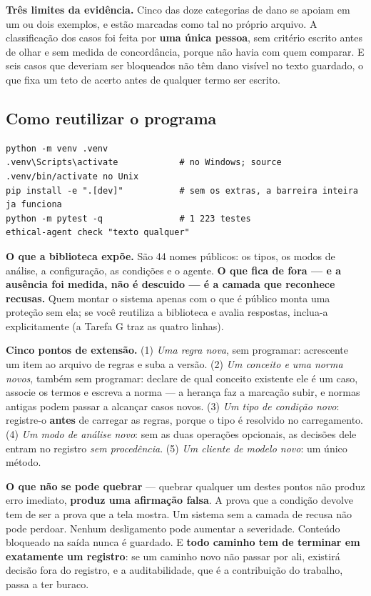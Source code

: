 \documentclass[10pt]{article}
\begin{document}
\textbf{Três limites da evidência.} Cinco das doze categorias de dano se apoiam em um ou dois exemplos, e estão marcadas como tal no próprio arquivo. A classificação dos casos foi feita por \textbf{uma única pessoa}, sem critério escrito antes de olhar e sem medida de concordância, porque não havia com quem comparar. E seis casos que deveriam ser bloqueados não têm dano visível no texto guardado, o que fixa um teto de acerto antes de qualquer termo ser escrito.

\subsection{Como reutilizar o programa}

\begin{lstlisting}
python -m venv .venv
.venv\Scripts\activate            # no Windows; source .venv/bin/activate no Unix
pip install -e ".[dev]"           # sem os extras, a barreira inteira ja funciona
python -m pytest -q               # 1 223 testes
ethical-agent check "texto qualquer"
\end{lstlisting}

\textbf{O que a biblioteca expõe.} São 44 nomes públicos: os tipos, os modos de análise, a configuração, as condições e o agente. \textbf{O que fica de fora --- e a ausência foi medida, não é descuido --- é a camada que reconhece recusas.} Quem montar o sistema apenas com o que é público monta uma proteção sem ela; se você reutiliza a biblioteca e avalia respostas, inclua-a explicitamente (a Tarefa G traz as quatro linhas).

\textbf{Cinco pontos de extensão.} (1) \emph{Uma regra nova}, sem programar: acrescente um item ao arquivo de regras e suba a versão. (2) \emph{Um conceito e uma norma novos}, também sem programar: declare de qual conceito existente ele é um caso, associe os termos e escreva a norma --- a herança faz a marcação subir, e normas antigas podem passar a alcançar casos novos. (3) \emph{Um tipo de condição novo}: registre-o \textbf{antes} de carregar as regras, porque o tipo é resolvido no carregamento. (4) \emph{Um modo de análise novo}: sem as duas operações opcionais, as decisões dele entram no registro \emph{sem procedência}. (5) \emph{Um cliente de modelo novo}: um único método.

\textbf{O que não se pode quebrar} --- quebrar qualquer um destes pontos não produz erro imediato, \textbf{produz uma afirmação falsa}. A prova que a condição devolve tem de ser a prova que a tela mostra. Um sistema sem a camada de recusa não pode perdoar. Nenhum desligamento pode aumentar a severidade. Conteúdo bloqueado na saída nunca é guardado. E \textbf{todo caminho tem de terminar em exatamente um registro}: se um caminho novo não passar por ali, existirá decisão fora do registro, e a auditabilidade, que é a contribuição do trabalho, passa a ter buraco.
\end{document}

